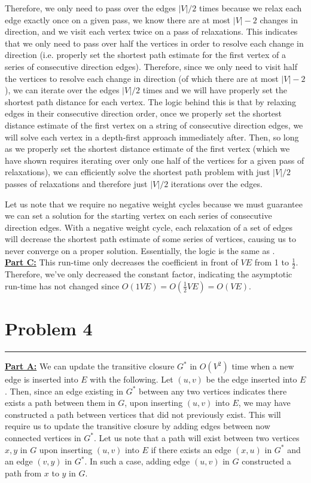 \documentclass[11pt]{article}
\def\separateline{\medskip\hrule\medskip}
\begin{document}
Therefore, we only need to pass over the edges $|V|/2$ times because we relax each edge exactly once on a given pass, we know there are at most $|V| - 2$ changes in direction, and we visit each vertex twice on a pass of relaxations. This indicates that we only need to pass over half the vertices in order to resolve each change in direction (i.e. properly set the shortest path estimate for the first vertex of a series of consecutive direction edges). Therefore, since we only need to visit half the vertices to resolve each change in direction (of which there are at most $|V| - 2$), we can iterate over the edges $|V| / 2$ times and we will have properly set the shortest path distance for each vertex. The logic behind this is that by relaxing edges in their consecutive direction order, once we properly set the shortest distance estimate of the first vertex on a string of consecutive direction edges, we will solve each vertex in a depth-first approach immediately after. Then, so long as we properly set the shortest distance estimate of the first vertex (which we have shown requires iterating over only one half of the vertices for a given pass of relaxations), we can efficiently solve the shortest path problem with just $|V|/2$ passes of relaxations and therefore just $|V|/2$ iterations over the edges.

Let us note that we require no negative weight cycles because we must guarantee we can set a solution for the starting vertex on each series of consecutive direction edges. With a negative weight cycle, each relaxation of a set of edges will decrease the shortest path estimate of some series of vertices, causing us to never converge on a proper solution. Essentially, the logic is the same as .\\

\underline{\textbf{Part C:}} This run-time only decreases the coefficient in front of $VE$ from 1 to $\frac{1}{2}$. Therefore, we've only decreased the constant factor, indicating the asymptotic run-time has not changed since $O(1VE) = O(\frac{1}{2}VE) = O(VE)$.

\newpage

\section{Problem 4}
\separateline

\underline{\textbf{Part A:}} We can update the transitive closure $G^*$ in $O(V^2)$ time when a new edge is inserted into $E$ with the following. Let $(u,v)$ be the edge inserted into $E$. Then, since an edge existing in $G^*$ between any two vertices indicates there exists a path between them in $G$, upon inserting $(u,v)$ into $E$, we may have constructed a path between vertices that did not previously exist. This will require us to update the transitive closure by adding edges between now connected vertices in $G^*$. Let us note that a path will exist between two vertices $x,y$ in $G$ upon inserting $(u,v)$ into $E$ if there exists an edge $(x,u)$ in $G^*$ and an edge $(v,y)$ in $G^*$. In such a case, adding edge $(u,v)$ in $G$ constructed a path from $x$ to $y$ in $G$.
\end{document}
